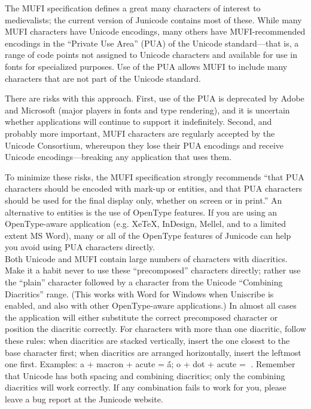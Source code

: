 \documentclass[a4paper]{article}
\begin{document}
The MUFI specification defines a great many characters of interest to
medievalists; the current version of Junicode contains most of
these. While many MUFI characters have Unicode encodings, many others
have MUFI-recommended encodings in the “Private Use Area” (PUA) of the
Unicode standard—that is, a range of code points not assigned to
Unicode characters and available for use in fonts for specialized
purposes. Use of the PUA allows MUFI to include many characters that
are not part of the Unicode standard.

There are risks with this approach. First, use of the PUA is
deprecated by Adobe and Microsoft (major players in fonts and type rendering),
and it is uncertain whether applications will continue to support it
indefinitely. Second, and probably more important, MUFI characters are
regularly accepted by the Unicode Consortium, whereupon they lose their
PUA encodings and receive Unicode encodings—breaking any
application that uses them.

To minimize these risks, the MUFI specification strongly recommends “that PUA
characters should be encoded with mark-up or entities, and that PUA characters should be used for the final display only, whether on screen or in print.” An alternative to
entities is the use of OpenType features. If you are using an OpenType-aware
application (e.g. XeTeX, InDesign, Mellel, and to a limited extent MS Word),
many or all of the OpenType features of Junicode can help you avoid using PUA
characters directly.\\

Both Unicode and MUFI contain large numbers of characters with diacritics.
Make it a habit never to use these “precomposed” characters directly; rather
use the “plain” character followed by a character from the Unicode “Combining
Diacritics” range. (This works with Word for Windows when Uniscribe is
enabled, and also with other OpenType-aware applications.) In almost all cases
the application will either substitute the correct precomposed character or
position the diacritic correctly. For characters with more than one diacritic,
follow these rules: when diacritics are stacked vertically, insert the one
closest to the base character first; when diacritics are arranged horizontally,
insert the leftmost one first. Examples: a + macron + acute = ā́; o + dot +
acute = . Remember that Unicode has both spacing and combining diacritics;
only the combining diacritics will work correctly. If any combination fails to
work for you, please leave a bug report at the Junicode website.\\
\end{document}
